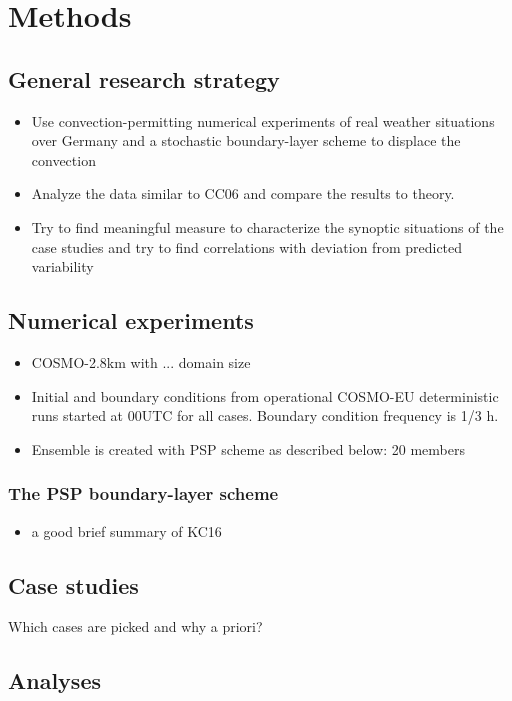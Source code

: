 \documentclass[a4paper, 12pt]{article}
\begin{document}
\section{Methods}

\subsection{General research strategy}
\begin{itemize}
 \item Use convection-permitting numerical experiments of real weather situations over Germany and a stochastic boundary-layer scheme to displace the convection
 \item Analyze the data similar to CC06 and compare the results to theory. 
 \item Try to find meaningful measure to characterize the synoptic situations of the case studies and try to find correlations with deviation from predicted variability
\end{itemize}

\subsection{Numerical experiments}

\begin{itemize}
 \item COSMO-2.8km with ... domain size
 \item Initial and boundary conditions from operational COSMO-EU deterministic runs started at 00UTC for all cases. Boundary condition frequency is 1/3 h. 
 \item Ensemble is created with PSP scheme as described below: 20 members
\end{itemize}

\subsubsection{The PSP boundary-layer scheme}
\begin{itemize}
 \item a good brief summary of KC16
\end{itemize}

\subsection{Case studies}
Which cases are picked and why a priori?

\subsection{Analyses}
\end{document}
